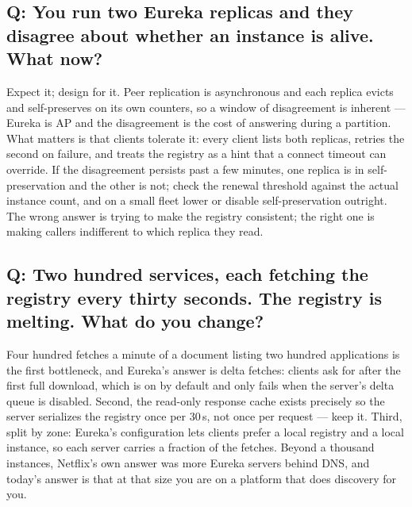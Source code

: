 \subsection*{Q: You run two Eureka replicas and they disagree about
whether an instance is alive. What now?}

Expect it; design for it. Peer replication is asynchronous and each
replica evicts and self-preserves on its own counters, so a window of
disagreement is inherent --- Eureka is AP and the disagreement is the
cost of answering during a partition. What matters is that clients
tolerate it: every client lists both replicas, retries the second on
failure, and treats the registry as a hint that a connect timeout can
override. If the disagreement persists past a few minutes, one replica
is in self-preservation and the other is not; check the renewal
threshold against the actual instance count, and on a small fleet
lower  or disable self-preservation
outright. The wrong answer is trying to make the registry consistent;
the right one is making callers indifferent to which replica they read.

\subsection*{Q: Two hundred services, each fetching the registry every
thirty seconds. The registry is melting. What do you change?}

Four hundred fetches a minute of a document listing two hundred
applications is the first bottleneck, and Eureka's answer is delta
fetches: clients ask for  after the first full
download, which is on by default and only fails when the server's
delta queue is disabled. Second, the read-only response cache exists
precisely so the server serializes the registry once per 30\,s, not
once per request --- keep it. Third, split by zone: Eureka's
 configuration lets clients prefer a local
registry and a local instance, so each server carries a fraction of
the fetches. Beyond a thousand instances, Netflix's own answer was
more Eureka servers behind DNS, and today's answer is that at that
size you are on a platform that does discovery for you.

